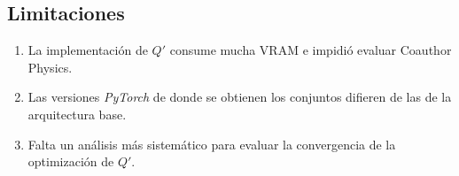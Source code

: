 \documentclass[twoside,twocolumn,10pt]{article}
\begin{document}
\subsection{Limitaciones}

\begin{enumerate}
    \item La implementación de $Q'$ consume mucha VRAM e impidió evaluar Coauthor Physics.
    \item Las versiones \textit{PyTorch} de donde se obtienen los conjuntos difieren de las de la arquitectura base.
    \item Falta un análisis más sistemático para evaluar la convergencia de la optimización de $Q'$.
\end{enumerate}

\balance
\fontsize{10}{12}\selectfont
\printbibliography
\end{document}
